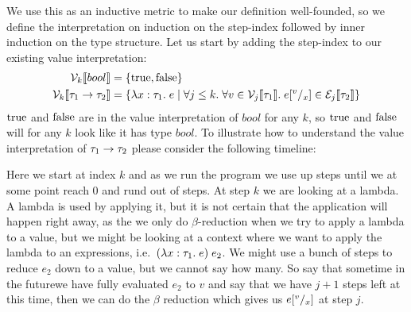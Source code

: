 We use this as an inductive metric to make our definition well-founded, so we define the interpretation on induction on the step-index followed by inner induction on the type structure. Let us start by adding the step-index to our existing value interpretation:
\begin{align*}
  \vpres{bool} &= \{\true,\false\} \\
  \vpres{\tarrow{\tau_1}{\tau_2}} &= \{\tlabs{x}{\tau_1}{e} \vbar \forall j \leq k. \; \forall v \in \vpres[j]{\tau_1}. \; \sub{e}{v}{x} \in \epres[j]{\tau_2} \}
\end{align*}
$\true$ and $\false$ are in the value interpretation of $bool$ for any $k$, so $\true$ and $\false$ will for any $k$ look like it has type $bool$. To illustrate how to understand the value interpretation of $\tarrow{\tau_1}{\tau_2}$ please consider the following timeline:  \\
\begin{center}
\end{center}
Here we start at index $k$ and as we run the program we use up steps until we at some point reach 0 and rund out of steps. At step $k$ we are looking at a lambda. A lambda is used by applying it, but it is not certain that the application will happen right away, as the we only do $\beta$-reduction when we try to apply a lambda to a value, but we might be looking at a context where we want to apply the lambda to an expressions, i.e.\ $(\tlabs{x}{\tau_1}{e})\; e_2$. We might use a bunch of steps to reduce $e_2$ down to a value, but we cannot say how many. So say that sometime in the futurewe have fully evaluated $e_2$ to $v$ and say that we have $j+1$ steps left at this time, then we can do the $\beta$ reduction which gives us $\sub{e}{v}{x}$ at step $j$. %

